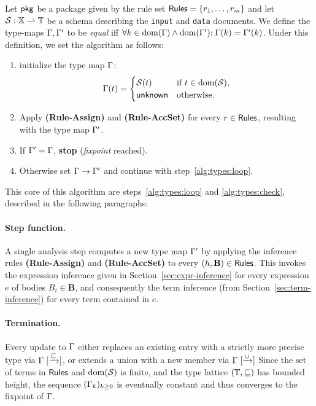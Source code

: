 Let $\mathsf{pkg}$ be a \rego package given by the rule set $\mathsf{Rules} = \{r_1, \ldots, r_m\}$
and let $\mathcal{S} : \mathbb{X} \rightharpoonup \mathbb{T}$ be a schema describing the \texttt{input} and \texttt{data} documents.
We define the type-maps $\Gamma,\Gamma'$ to be \emph{equal} iff $\forall k \in \mathrm{dom}(\Gamma) \land \mathrm{dom}(\Gamma'){:}\; \Gamma(k) = \Gamma'(k)$.
Under this definition, we set the algorithm as follows:
\begin{enumerate}
  \item initialize the type map $\Gamma$:
\[
  \Gamma(t) =
  \begin{cases}
    \mathcal{S}(t) & \text{if } t \in \mathrm{dom}(\mathcal{S}), \\
    \mathsf{unknown}   & \text{otherwise.}
  \end{cases}
\]
  \item Apply \textbf{(Rule-Assign)} and \textbf{(Rule-AccSet)} for every $r \in \mathsf{Rules}$, resulting with the type map $\Gamma'$. \label{alg:types:loop}
  \item If $\Gamma' = \Gamma$, \textbf{stop} (\emph{fixpoint} reached). \label{alg:types:check}
  \item Otherwise set $\Gamma \rightarrow \Gamma'$ and continue with step~\ref{alg:types:loop}.
\end{enumerate}
This core of this algorithm are steps~\ref{alg:types:loop} and \ref{alg:types:check}, described in the following paragraphs:

\paragraph{Step function.}
A single analysis step computes a new type map $\Gamma'$ by applying the inference rules \textbf{(Rule-Assign)} and \textbf{(Rule-AccSet)} to every $(h, \mathbf{B}) \in \mathsf{Rules}$.
This invokes the expression inference given in Section~\ref{sec:expr-inference} for every expression $e$ of bodies $B_i \in \mathbf{B}$, and consequently the term inference (from Section~\ref{sec:term-inference}) for every term contained in $e$.

\paragraph{Termination.}
Every update to $\Gamma$ either replaces an existing entry with a strictly more precise
type via $\Gamma \mathrel{[ \xrightarrow{\sqsubseteq} ]}$, or extends a union with a new member via $\Gamma \mathrel{[ \xrightarrow{\cup} ]}$
Since the set of terms in $\mathsf{Rules}$ and $\mathrm{dom}(\mathcal{S})$ is finite, and the
type lattice $(\mathbb{T}, \sqsubseteq)$ has bounded height, the sequence $(\Gamma_k)_{k \geq 0}$
is eventually constant and thus converges to the fixpoint of $\Gamma$.

